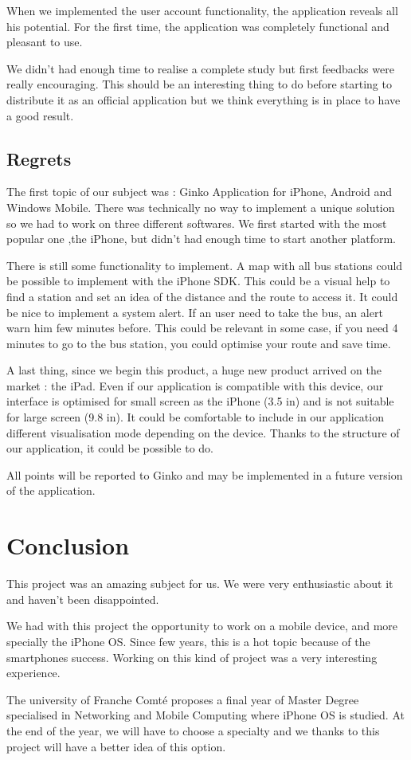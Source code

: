 \documentclass[a4paper, 12pt]{report}
\begin{document}
When we implemented the user account functionality, the application reveals all his potential. For the first time, the application was completely functional and pleasant to use.

We didn't had enough time to realise a complete study but first feedbacks were really encouraging. This should be an interesting thing to do before starting to distribute it as an official application but we think everything is in place to have a good result.

\section{Regrets} %

The first topic of our subject was : Ginko Application for iPhone, Android and Windows Mobile. There was technically no way to implement a unique solution so we had to work on three different softwares. We first started with the most popular one ,the iPhone, but didn't had enough time to start another platform.

There is still some functionality to implement. A map with all bus stations could be possible to implement with the iPhone SDK. This could be a visual help to find a station and set an idea of the distance and the route to access it. It could be nice to implement a system alert. If an user need to take the bus, an alert warn him few minutes before. This could be relevant in some case, if you need 4 minutes to go to the bus station, you could optimise your route and save time.

A last thing, since we begin this product, a huge new product arrived on the market : the iPad. Even if our application is compatible with this device, our interface is optimised for small screen as the iPhone (3.5 in) and is not suitable for large screen (9.8 in). It could be comfortable to include in our application different visualisation mode depending on the device. Thanks to the structure of our application, it could be possible to do.

All points will be reported to Ginko and may be implemented in a future version of the application.

\chapter{Conclusion}

This project was an amazing subject for us. We were very enthusiastic about it and haven't been disappointed.

We had with this project the opportunity to work on a mobile device, and more specially the iPhone OS. Since few years, this is a hot topic because of the smartphones success. Working on this kind of project was a very interesting experience.

The university of Franche Comt\'{e} proposes a final year of Master Degree specialised in Networking and Mobile Computing where iPhone OS is studied. At the end of the year, we will have to choose a specialty and we thanks to this project will have a better idea of this option.
\end{document}
